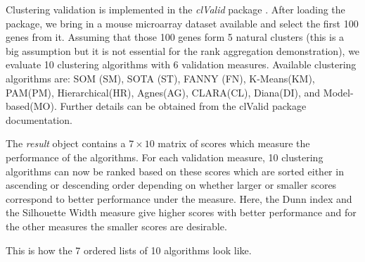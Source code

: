 \documentclass[11pt]{article}
\begin{document}
    Clustering validation is implemented in the \emph{clValid} package \cite{Bro07}. After loading the package, we bring in a mouse microarray dataset
    available and select the first 100 genes from it.
    Assuming that those 100 genes form 5 natural clusters (this is a big assumption but it is not essential for the rank aggregation demonstration),
    we evaluate 10 clustering algorithms with 6 validation measures. Available clustering algorithms are: SOM (SM), SOTA (ST), FANNY (FN),
    K-Means(KM), PAM(PM), Hierarchical(HR), Agnes(AG), CLARA(CL), Diana(DI), and Model-based(MO). 
    Further details can be obtained from the clValid package documentation.
    
    
\begin{Schunk}
\end{Schunk}
    
    The \emph{result} object contains a $7$ matrix of scores which measure the performance of the algorithms. 
    For each validation measure, 10 clustering algorithms can now be ranked based on these scores which 
    are sorted either in ascending or descending order depending on whether larger or smaller scores
    correspond to better performance under the measure. Here, the Dunn index and the Silhouette Width measure give higher scores 
    with better performance and for the other measures the smaller scores are desirable. 
    

    This is how the 7 ordered lists of 10 algorithms look like.
    
\end{document}
